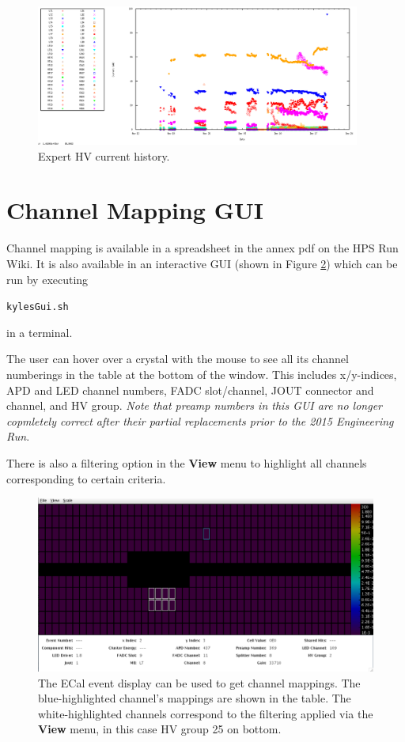 \documentclass[12pt]{article}
\begin{document}
{\begin{figure}[htbp] \centering
\includegraphics[width=0.95\textwidth]{pics/ECALHVCURRENTS_2014_12_20.png}
\caption{ \label{HVhistory} Expert HV current history.}
\end{figure}

\newpage
\section{Channel Mapping GUI}
Channel mapping is available in a spreadsheet in the annex pdf on the HPS Run Wiki. It is also available in an interactive GUI (shown in Figure \ref{fig:kylesGui}) which can be run by executing \begin{center}\texttt{kylesGui.sh}\end{center} in a terminal.

The user can hover over a crystal with the mouse to see all its channel numberings in the table at the bottom of the window.  This includes x/y-indices, APD and LED channel numbers, FADC slot/channel, JOUT connector and channel, and HV group.  {\em Note that preamp numbers in this GUI are no longer copmletely correct after their partial replacements prior to the 2015 Engineering Run}.  

There is also a filtering option in the {\bf View} menu to highlight all channels corresponding to certain criteria.

\begin{figure}[htbp]\centering
    \includegraphics[width=16cm]{pics/kylesGui.png}
    \caption{The ECal event display can be used to get channel mappings.  The blue-highlighted channel's mappings are shown in the table.  The white-highlighted channels correspond to the filtering applied via the {\bf View} menu, in this case HV group 25 on bottom.\label{fig:kylesGui}}
\end{figure}

}
\end{document}
